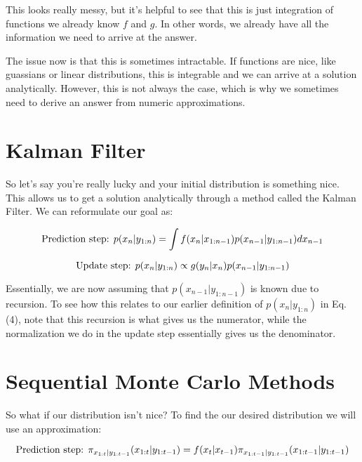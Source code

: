 \documentclass{article}
\begin{document}
This looks really messy, but it's helpful to see that this is just integration of functions we already know $f$ and $g$. In other words, we already have all the information we need to arrive at the answer. 

The issue now is that this is sometimes intractable. If functions are nice, like guassians or linear distributions, this is integrable and we can arrive at a solution analytically. However, this is not always the case, which is why we sometimes need to derive an answer from numeric approximations.

\section{Kalman Filter}

So let's say you're really lucky and your initial distribution is something nice. This allows us to get a solution analytically through a method called the Kalman Filter. We can reformulate our goal as:

\begin{equation}
\textnormal{Prediction step:  }
p(x_{n}|y_{1:n}) = \int f(x_n|x_{1:n-1})p(x_{n-1}|y_{1:n-1}) dx_{n-1}
\end{equation}

\begin{equation}
\textnormal{Update step:  }
p(x_{n}|y_{1:n}) \propto g(y_n|x_n)p(x_{n-1}|y_{1:n-1})
\end{equation}

Essentially, we are now assuming that $p(x_{n-1}|y_{1:n-1})$ is known due to recursion. To see how this relates to our earlier definition of $p(x_{n}|y_{1:n})$ in Eq. (4), note that this recursion is what gives us the numerator, while the normalization we do in the update step essentially gives us the denominator. 

\section{Sequential Monte Carlo Methods}

So what if our distribution isn't nice? To find the our desired distribution we will use an approximation:

\begin{equation}
\textnormal{Prediction step:  }
\pi_{x_{1:t}|y_{1:t-1}}(x_{1:t}|y_{1:t-1})= f(x_t|x_{t-1}) \pi_{x_{1:t-1}|y_{1:t-1}}(x_{1:t-1}|y_{1:t-1})
\end{equation}
\end{document}
